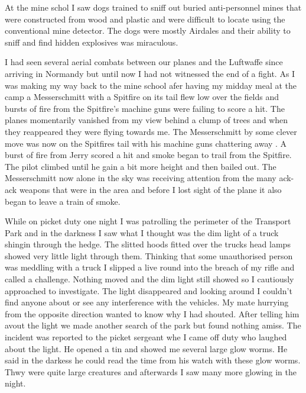At the mine schol I saw dogs trained to sniff out buried
anti-personnel mines that were constructed from wood and plastic and
were difficult to locate using the conventional mine detector. The dogs
were mostly Airdales and their ability to sniff and find hidden
explosives was miraculous.

I had seen several aerial combats between our planes and the Luftwaffe
since arriving in Normandy but until now I had not witnessed the end
of a fight. As I was making my way back to the mine school afer having
my midday meal at the camp a Messerschmitt with a Spitfire on its tail
flew low over the fields and bursts of fire from the Spitfire's
machine guns were failing to score a hit. The planes momentarily
vanished from my view behind a clump of trees and when they reappeared
they were flying towards me. The Messerschmitt by some clever move was
now on the Spitfires tail with his machine guns chattering away . A
burst of fire from Jerry scored a hit and smoke began to trail from
the Spitfire. The pilot climbed until he gain a bit more height and
then bailed out. The Messerschmitt now alone in the sky was receiving
attention from the many ack-ack weapons that were in the area and
before I lost sight of the plane it also began to leave a train of
smoke.

While on picket duty one night I was patrolling the perimeter of the
Transport Park and in the darkness I saw what I thought was the dim
light of a truck shingin through the hedge. The slitted hoods fitted
over the trucks head lamps showed very little light through
them. Thinking that some unauthorised person was meddling with a truck
I slipped a live round into the breach of my rifle and called a
challenge. Nothing moved and the dim light still showed so I
cautiously approached to investigate. The light disappeared and
looking around I couldn't find anyone about or see any interference
with the vehicles. My mate hurrying from the opposite direction wanted
to know why I had shouted. After telling him avout the light we made
another search of the park but found nothing amiss. The incident was
reported to the picket sergeant whe I came off duty who laughed about
the light. He opened a tin and showed me several large glow worms. He
said in the darkess he could read the time from his watch with these
glow worms. Thwy were quite large creatures and afterwards I saw many
more glowing in the night.


